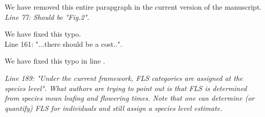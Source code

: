 \documentclass{article}[11pt]
\begin{document}
\noindent We have removed this entire parapgraph in the current version of the manuscript.\\

\emph{Line 77: Should be "Fig.2".}

\noindent We have fixed this typo.\\

Line 161: "...there should be a cost..".

\noindent We have fixed this typo in line .

\emph{Line 189: "Under the current framework, FLS categories are assigned at the species level". What authors are trying to point out is that FLS is determined from species mean leafing and flowering times. Note that one can determine (or quantify) FLS for individuals and still assign a species level estimate.}\\
\end{document}
